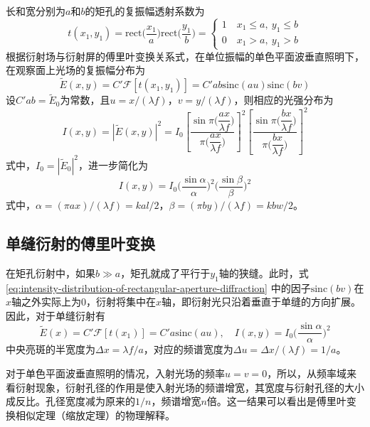 \documentclass[cn,10pt,chinesefont=founder,math=mtpro2,cite=super,toc=onecol,twoside]{elegantbook}
\begin{document}
长和宽分别为$a$和$b$的矩孔的复振幅透射系数为
\begin{equation}
t(x_1,y_1)=\mathrm{rect}\bigg(\frac{x_1}{a}\bigg)\mathrm{rect}\bigg(\frac{y_1}{b}\bigg)=
\begin{cases}
1\quad x_1\leqslant a,\ y_1\leqslant b\\
0\quad x_1>a,\ y_1>b
\end{cases}
\end{equation}
根据衍射场与衍射屏的傅里叶变换关系式，在单位振幅的单色平面波垂直照明下，在观察面上光场的复振幅分布为
\begin{equation}
\tilde{E}(x,y)=C'\mathscr{F}[t(x_1,y_1)]=C'ab\mathrm{sinc}(au)\mathrm{sinc}(bv)
\end{equation}
设$C'ab=\tilde{E}_0$为常数，且$u=x/(\lambda f)$，$v=y/(\lambda f)$，则相应的光强分布为
\begin{equation}
I(x,y)=|\tilde{E}(x,y)|^2=I_0\left[\frac{\sin\pi\bigg(\dfrac{ax}{\lambda f}\bigg)}{\pi\bigg(\dfrac{ax}{\lambda f}\bigg)}\right]^2\left[\frac{\sin\pi\bigg(\dfrac{bx}{\lambda f}\bigg)}{\pi\bigg(\dfrac{bx}{\lambda f}\bigg)}\right]^2
\end{equation}
式中，$I_0=|\tilde{E}_0|^2$，进一步简化为
\begin{equation}
I(x,y)=I_0\bigg(\frac{\sin\alpha}{\alpha}\bigg)^2\bigg(\frac{\sin\beta}{\beta}\bigg)^2
\label{eq:intensity-distribution-of-rectangular-aperture-diffraction}
\end{equation}
式中，$\alpha=(\pi ax)/(\lambda f)=kal/2$，$\beta=(\pi by)/(\lambda f)=kbw/2$。

\subsection{单缝衍射的傅里叶变换}
在矩孔衍射中，如果$b\gg a$，矩孔就成了平行于$y_1$轴的狭缝。此时，式 \eqref{eq:intensity-distribution-of-rectangular-aperture-diffraction} 中的因子$\mathrm{sinc}(bv)$在$x$轴之外实际上为$0$，衍射将集中在$x$轴，即衍射光只沿着垂直于单缝的方向扩展。因此，对于单缝衍射有
\begin{equation}
\tilde{E}(x)=C'\mathscr{F}[t(x_1)]=C'a\mathrm{sinc}(au),\quad I(x,y)=I_0\bigg(\frac{\sin\alpha}{\alpha}\bigg)^2
\end{equation}
中央亮斑的半宽度为$\Delta x=\lambda f/a$，对应的频谱宽度为$\Delta u=\Delta x/(\lambda f)=1/a$。

对于单色平面波垂直照明的情况，入射光场的频率$u=v=0$，所以，从频率域来看衍射现象，衍射孔径的作用是使入射光场的频谱增宽，其宽度与衍射孔径的大小成反比。孔径宽度减为原来的$1/n$，频谱增宽$n$倍。这一结果可以看出是傅里叶变换相似定理（缩放定理）的物理解释。
\end{document}
